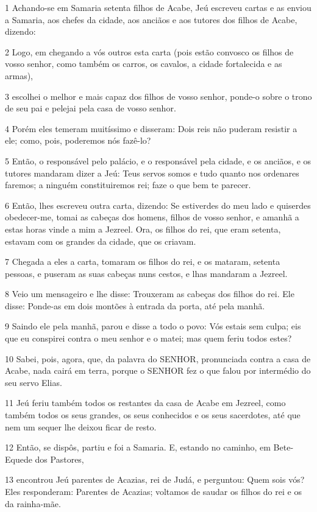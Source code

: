 \par 1 Achando-se em Samaria setenta filhos de Acabe, Jeú escreveu cartas e as enviou a Samaria, aos chefes da cidade, aos anciãos e aos tutores dos filhos de Acabe, dizendo:
\par 2 Logo, em chegando a vós outros esta carta (pois estão convosco os filhos de vosso senhor, como também os carros, os cavalos, a cidade fortalecida e as armas),
\par 3 escolhei o melhor e mais capaz dos filhos de vosso senhor, ponde-o sobre o trono de seu pai e pelejai pela casa de vosso senhor.
\par 4 Porém eles temeram muitíssimo e disseram: Dois reis não puderam resistir a ele; como, pois, poderemos nós fazê-lo?
\par 5 Então, o responsável pelo palácio, e o responsável pela cidade, e os anciãos, e os tutores mandaram dizer a Jeú: Teus servos somos e tudo quanto nos ordenares faremos; a ninguém constituiremos rei; faze o que bem te parecer.
\par 6 Então, lhes escreveu outra carta, dizendo: Se estiverdes do meu lado e quiserdes obedecer-me, tomai as cabeças dos homens, filhos de vosso senhor, e amanhã a estas horas vinde a mim a Jezreel. Ora, os filhos do rei, que eram setenta, estavam com os grandes da cidade, que os criavam.
\par 7 Chegada a eles a carta, tomaram os filhos do rei, e os mataram, setenta pessoas, e puseram as suas cabeças nuns cestos, e lhas mandaram a Jezreel.
\par 8 Veio um mensageiro e lhe disse: Trouxeram as cabeças dos filhos do rei. Ele disse: Ponde-as em dois montões à entrada da porta, até pela manhã.
\par 9 Saindo ele pela manhã, parou e disse a todo o povo: Vós estais sem culpa; eis que eu conspirei contra o meu senhor e o matei; mas quem feriu todos estes?
\par 10 Sabei, pois, agora, que, da palavra do SENHOR, pronunciada contra a casa de Acabe, nada cairá em terra, porque o SENHOR fez o que falou por intermédio do seu servo Elias.
\par 11 Jeú feriu também todos os restantes da casa de Acabe em Jezreel, como também todos os seus grandes, os seus conhecidos e os seus sacerdotes, até que nem um sequer lhe deixou ficar de resto.
\par 12 Então, se dispôs, partiu e foi a Samaria. E, estando no caminho, em Bete-Equede dos Pastores,
\par 13 encontrou Jeú parentes de Acazias, rei de Judá, e perguntou: Quem sois vós? Eles responderam: Parentes de Acazias; voltamos de saudar os filhos do rei e os da rainha-mãe.
